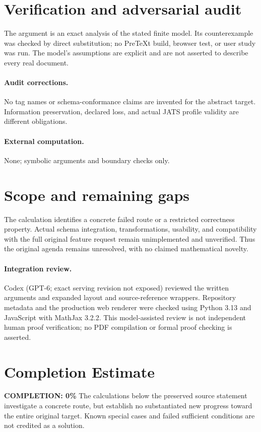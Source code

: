 \documentclass[11pt]{article}
\begin{document}
\section{Verification and adversarial audit}
The argument is an exact analysis of the stated finite model. Its counterexample was checked by direct substitution; no PreTeXt build, browser test, or user study was run. The model's assumptions are explicit and are not asserted to describe every real document.
\paragraph{Audit corrections.} No tag names or schema-conformance claims are invented for the abstract target. Information preservation, declared loss, and actual JATS profile validity are different obligations.
\paragraph{External computation.} None; symbolic arguments and boundary checks only.
\section{Scope and remaining gaps}
The calculation identifies a concrete failed route or a restricted correctness property. Actual schema integration, transformations, usability, and compatibility with the full original feature request remain unimplemented and unverified. Thus the original agenda remains unresolved, with no claimed mathematical novelty.
\paragraph{Integration review.} Codex (GPT-6; exact serving revision not exposed) reviewed the written arguments and expanded layout and source-reference wrappers. Repository metadata and the production web renderer were checked using Python 3.13 and JavaScript with MathJax 3.2.2. This model-assisted review is not independent human proof verification; no PDF compilation or formal proof checking is asserted.

\section{Completion Estimate}
\noindent\textbf{COMPLETION: 0\%}
The calculations below the preserved source statement investigate a concrete route,
but establish no substantiated new progress toward the entire original target.
Known special cases and failed sufficient conditions are not credited as a solution.
\end{document}
